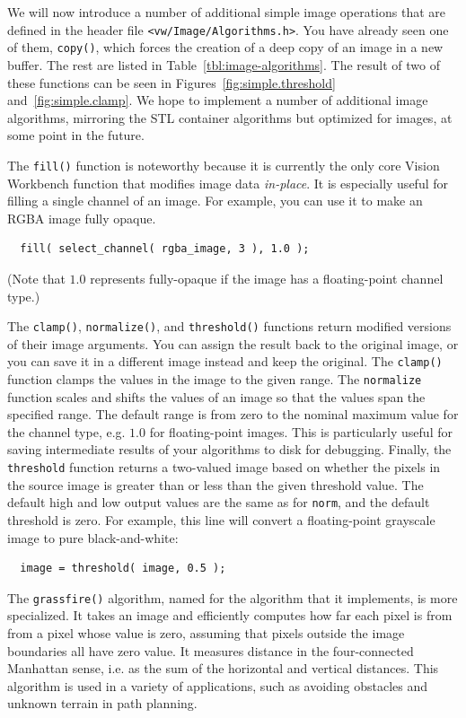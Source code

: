 We will now introduce a number of additional simple image operations
that are defined in the header file \verb#<vw/Image/Algorithms.h>#.
You have already seen one of them, \verb#copy()#, which forces the
creation of a deep copy of an image in a new buffer.  The rest are
listed in Table~\ref{tbl:image-algorithms}.  The result of two of
these functions can be seen in Figures~\ref{fig:simple.threshold}
and~\ref{fig:simple.clamp}.  We hope to implement a number of
additional image algorithms, mirroring the STL container algorithms
but optimized for images, at some point in the future.

The \verb#fill()# function is noteworthy because it is currently the
only core Vision Workbench function that modifies image data {\it
  in-place}.  It is especially useful for filling a single channel of
an image.  For example, you can use it to make an RGBA image fully
opaque.
\begin{verbatim}
  fill( select_channel( rgba_image, 3 ), 1.0 );
\end{verbatim}
(Note that $1.0$ represents fully-opaque if the image has a 
floating-point channel type.)

The \verb#clamp()#, \verb#normalize()#, and \verb#threshold()#
functions return modified versions of their image arguments.
You can assign the result back to the original image, or you can 
save it in a different image instead and keep the original.  
The \verb#clamp()# function clamps the values in the image to 
the given range.  The \verb#normalize# function scales and 
shifts the values of an image so that the values span the 
specified range.  The default range is from zero to the nominal 
maximum value for the channel type, e.g. $1.0$ for floating-point 
images.  This is particularly useful for saving intermediate 
results of your algorithms to disk for debugging.  Finally, the 
\verb#threshold# function returns a two-valued image based on  
whether the pixels in the source image is greater than or less 
than the given threshold value.  The default high and low output 
values are the same as for \verb#norm#, and the default threshold 
is zero.  For example, this line will convert a floating-point 
grayscale image to pure black-and-white:
\begin{verbatim}
  image = threshold( image, 0.5 );
\end{verbatim}

The \verb#grassfire()# algorithm, named for the algorithm that 
it implements, is more specialized.  It takes an image and 
efficiently computes how far each pixel is from from a pixel 
whose value is zero, assuming that pixels outside the image 
boundaries all have zero value.  It measures distance in the 
four-connected Manhattan sense, i.e. as the sum of the 
horizontal and vertical distances.  This algorithm is used in 
a variety of applications, such as avoiding obstacles and 
unknown terrain in path planning.




